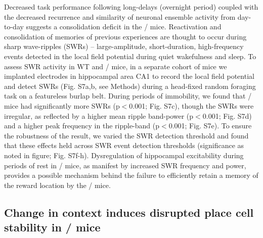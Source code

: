 Decreased task performance following long-delays (overnight period) coupled with the decreased recurrence and similarity of neuronal ensemble activity from day-to-day suggests a consolidation deficit in the \df/ mice. Reactivation and consolidation of memories of previous experiences are thought to occur during sharp wave-ripples (SWRs) -- large-amplitude, short-duration, high-frequency events detected in the local field potential \citep{Buzsaki2015, Diba2007, Dupret2010a, Foster2006, Jadhav2012, Kudrimoti1999, Wilson1994} during quiet wakefulness and sleep. To assess SWR activity in WT and \df/ mice, in a separate cohort of mice we implanted electrodes in hippocampal area CA1 to record the local field potential and detect SWRs (Fig. S7a,b, see Methods) during a head-fixed random foraging task on a featureless burlap belt. During periods of immobility, we found that \df/ mice had significantly more SWRs (p$<$0.001; Fig. S7c),  though the SWRs were irregular, as reflected by a higher mean ripple band-power (p$<$0.001; Fig. S7d) and a higher peak frequency in the ripple-band (p$<$0.001; Fig. S7e). To ensure the robustness of the result, we varied the SWR detection threshold and found that these effects held across SWR event detection thresholds (significance as noted in figure; Fig. S7f-h). Dysregulation of hippocampal excitability during periods of rest in \df/ mice, as manifest by increased SWR frequency and power, provides a possible mechanism behind the failure to efficiently retain a memory of the reward location by the \df/ mice.

\subsection{Change in context induces disrupted place cell stability in \df/ mice}

